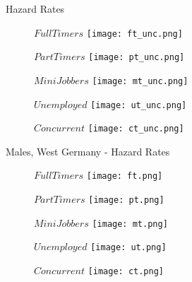 \documentclass{beamer}
\begin{document}
\begin{frame}{Hazard Rates}
\begin{figure}[!t]
\centering
\begin{minipage}[b]{0.3\textwidth}{$Full Timers$}
\centering
\texttt{[image: ft\_unc.png]}
\end{minipage}
\begin{minipage}[b]{0.3\textwidth}{$Part Timers$}
\centering
\texttt{[image: pt\_unc.png]}
\end{minipage}
\begin{minipage}[b]{0.3\textwidth}{$Mini Jobbers$}
\centering
\texttt{[image: mt\_unc.png]}
\end{minipage}
\end{figure}
\begin{figure}[!t]
\centering
\begin{minipage}[b]{0.3\textwidth}{$Unemployed$}
\centering
\texttt{[image: ut\_unc.png]}
\end{minipage}
\begin{minipage}[b]{0.3\textwidth}{$Concurrent$}
\centering
\texttt{[image: ct\_unc.png]}
\end{minipage}
\end{figure}
\end{frame}


\begin{frame}{Males, West Germany - Hazard Rates}
\begin{figure}[!t]
\centering
\begin{minipage}[b]{0.3\textwidth}{$Full Timers$}
\centering
\texttt{[image: ft.png]}
\end{minipage}
\begin{minipage}[b]{0.3\textwidth}{$Part Timers$}
\centering
\texttt{[image: pt.png]}
\end{minipage}
\begin{minipage}[b]{0.3\textwidth}{$Mini Jobbers$}
\centering
\texttt{[image: mt.png]}
\end{minipage}
\end{figure}
\begin{figure}[!t]
\centering
\begin{minipage}[b]{0.3\textwidth}{$Unemployed$}
\centering
\texttt{[image: ut.png]}
\end{minipage}
\begin{minipage}[b]{0.3\textwidth}{$Concurrent$}
\centering
\texttt{[image: ct.png]}
\end{minipage}
\end{figure}
\end{frame}
\end{document}
